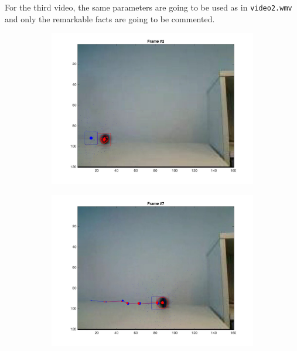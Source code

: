 \documentclass{ethz_report}
\begin{document}
For the third video, the same parameters are going to be used as in \texttt{video2.wmv} and only the remarkable facts are going to be commented.

\begin{figure}[h]
    \centering
    \begin{subfigure}[b]{.25\textwidth}
        \centering
        \includegraphics[width=1\linewidth]{images/video3__1}
    \end{subfigure}%
    \begin{subfigure}[b]{.25\textwidth}
        \centering
        \includegraphics[width=1\linewidth]{images/video3__6}
    \end{subfigure}%
    \begin{subfigure}[b]{.25\textwidth}

\end{subfigure}
\end{figure}
\end{document}
